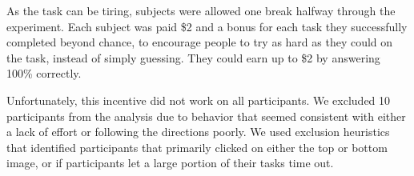 As the task can be tiring, subjects were allowed one break halfway through the experiment. Each subject was paid \$2 and a bonus for each task they successfully completed beyond chance, to encourage people to try as hard as they could on the task, instead of simply guessing. They could earn up to \$2 by answering 100\% correctly.  

Unfortunately, this incentive did not work on all participants. We excluded 10 participants from the analysis due to behavior that seemed consistent with either a lack of effort or following the directions poorly.  We used exclusion heuristics that identified participants that primarily clicked on either the top or bottom image, or if participants let a large portion of their tasks time out.






